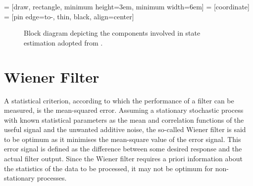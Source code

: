  = [draw, rectangle, minimum height=3em, minimum width=6em]
 = [coordinate]
 = [pin edge={to-, thin, black}, align=center]

\begin{figure}
\centering
{}
\caption{Block diagram depicting the components involved in state estimation adopted from \cite{haykin2002adaptive}.} \label{fig:state_estimation}
\end{figure}

\section{Wiener Filter}

A statistical criterion, according to which the performance of a filter can be measured, is the mean-squared error. Assuming a stationary stochastic process with known statistical parameters as the mean and correlation functions of the useful signal and the unwanted additive noise, the so-called Wiener filter is said to be optimum as it minimises the mean-square value of the error signal. This error signal is defined as the difference between some desired response and the actual filter output. Since the Wiener filter requires a priori information about the statistics of the data to be processed, it may not be optimum for non-stationary processes.

